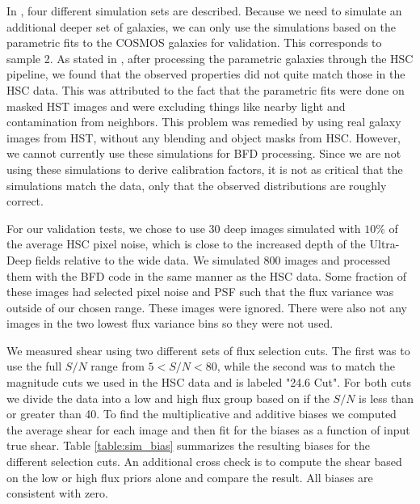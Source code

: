 \documentclass[useAMS,usenatbib]{mnras}
\begin{document}
In \cite{SimPaper:inprep}, four different simulation sets are described.  Because we need to simulate an additional deeper set of galaxies, we can only use the simulations based on the parametric fits to the COSMOS galaxies for validation.  This corresponds to sample 2.  As stated in \cite{SimPaper:inprep}, after processing the parametric galaxies through the HSC pipeline, we found that the observed properties did not quite match those in the HSC data.  This was attributed to the fact that the parametric fits were done on masked HST images and were excluding things like nearby light and contamination from neighbors. This problem was remedied by using real galaxy images from HST, without any blending and object masks from HSC.  However, we cannot currently use these simulations for BFD processing.  
Since we are not using these simulations to derive calibration factors, it is not as critical that the simulations match the data, only that the observed distributions are roughly correct.

For our validation tests, we chose to use 30 deep images simulated with $10\%$ of the average HSC pixel noise, which is close to the increased depth of the Ultra-Deep fields relative to the wide data.   We simulated 800 images and processed them with the BFD code in the same manner as the HSC data.  Some fraction of these images had selected pixel noise and PSF such that the flux variance was outside of our chosen range.  These images were ignored.  There were also not any images in the two lowest flux variance bins so they were not used.  

We measured shear using two different sets of flux selection cuts.  The first was to use the full $S/N$ range from $5 < S/N < 80$, while the second was to match the magnitude cuts we used in the HSC data and is labeled "24.6 Cut".  For both cuts we divide the data into a low and high flux group based on if the $S/N$ is less than or greater than 40.  To find the multiplicative and additive biases we computed the average shear for each image and then fit for the biases as a function of input true shear.  Table \ref{table:sim_bias} summarizes the resulting biases for the different selection cuts.  An additional cross check is to compute the shear based on the low or high flux priors alone and compare the result.  All biases are consistent with zero.
\end{document}
